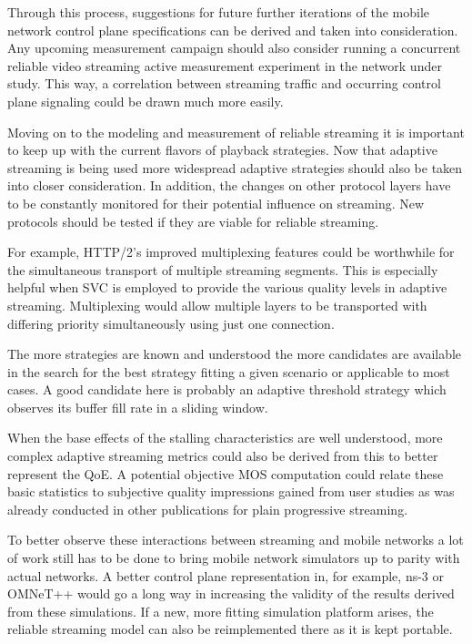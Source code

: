Through this process, suggestions for future further iterations of the mobile network control plane specifications can be derived and taken into consideration. Any upcoming measurement campaign should also consider running a concurrent reliable video streaming active measurement experiment in the network under study. This way, a correlation between streaming traffic and occurring control plane signaling could be drawn much more easily.


Moving on to the modeling and measurement of reliable streaming it is important to keep up with the current flavors of playback strategies. Now that adaptive streaming is being used more widespread adaptive strategies should also be taken into closer consideration. In addition, the changes on other protocol layers have to be constantly monitored for their potential influence on streaming. New protocols should be tested if they are viable for reliable streaming. 

For example, \gls{HTTP}/2's improved multiplexing features could be worthwhile for the simultaneous transport of multiple streaming segments. This is especially helpful when \gls{SVC} is employed to provide the various quality levels in adaptive streaming. Multiplexing would allow multiple layers to be transported with differing priority simultaneously using just one connection.

The more strategies are known and understood the more candidates are available in the search for the best strategy fitting a given scenario or applicable to most cases. A good candidate here is probably an adaptive threshold strategy which observes its buffer fill rate in a sliding window.

When the base effects of the stalling characteristics are well understood, more complex adaptive streaming metrics could also be derived from this to better represent the \gls{QoE}. A potential objective \gls{MOS} computation could relate these basic statistics to subjective quality impressions gained from user studies as was already conducted in other publications for plain progressive streaming.


To better observe these interactions between streaming and mobile networks a lot of work still has to be done to bring mobile network simulators up to parity with actual networks. A better control plane representation in, for example, ns-3 or OMNeT++ would go a long way in increasing the validity of the results derived from these simulations. If a new, more fitting simulation platform arises, the reliable streaming model can also be reimplemented there as it is kept portable.

